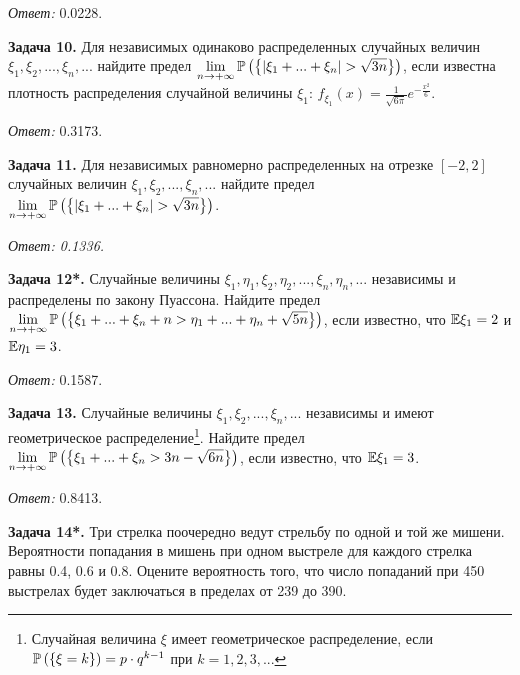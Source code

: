 \textit{Ответ: }0.0228.\textit{}

 

\textbf{Задача 10. }Для независимых одинаково распределенных случайных величин $\xi _{1} ,\xi _{2} ,...,\xi _{n} ,...$ найдите предел $\mathop{\lim }\limits_{n\to +\infty } {\rm {\mathbb P}}\left(\left\{\left|\xi _{1} +...+\xi _{n} \right|>\sqrt{3n} \right\}\right)$, если известна плотность распределения случайной величины $\xi _{1} $: $f_{\xi _{1} } \left(x\right)=\frac{1}{\sqrt{6\pi } } e^{-\frac{x^{2} }{6} } $. 

\textit{Ответ: }0.3173.



\textbf{Задача 11. }Для независимых равномерно распределенных на отрезке $\left[-2,2\right]$ случайных величин $\xi _{1} ,\xi _{2} ,...,\xi _{n} ,...$ найдите предел $\mathop{\lim }\limits_{n\to +\infty } {\rm {\mathbb P}}\left(\left\{\left|\xi _{1} +...+\xi _{n} \right|>\sqrt{3n} \right\}\right)$. 

\textit{Ответ: 0.1336.}

 

\textbf{Задача 12*. }Случайные величины $\xi _{1} ,\eta _{1} ,\xi _{2} ,\eta _{2} ,...,\xi _{n} ,\eta _{n} ,...$ независимы и распределены по закону Пуассона. Найдите предел $\mathop{\lim }\limits_{n\to +\infty } {\rm {\mathbb P}}\left(\left\{\xi _{1} +...+\xi _{n} +n>\eta _{1} +...+\eta _{n} +\sqrt{5n} \right\}\right)$, если известно, что ${\rm {\mathbb E}}\xi _{1} =2$ и ${\rm {\mathbb E}}\eta _{1} =3$. 

\textit{Ответ: }0.1587.



\textbf{Задача 13. }Случайные величины $\xi _{1} ,\xi _{2} ,...,\xi _{n} ,...$ независимы и имеют геометрическое распределение\footnote{ Случайная величина  $\xi $  имеет геометрическое распределение, если  ${\rm {\mathbb P}}\left(\left\{\xi =k\right\}\right)=p\cdot q^{k-1} $  при  $k=1,2,3,...$ }. Найдите предел $\mathop{\lim }\limits_{n\to +\infty } {\rm {\mathbb P}}\left(\left\{\xi _{1} +...+\xi _{n} >3n-\sqrt{6n} \right\}\right)$, если известно, что ${\rm {\mathbb E}}\xi _{1} =3$. 

\textit{Ответ: }0.8413.

 

\textbf{Задача 14*. }Три стрелка поочередно ведут стрельбу по одной и той же мишени. Вероятности попадания в мишень при одном выстреле для каждого стрелка равны 0.4, 0.6 и 0.8. Оцените вероятность того, что число попаданий при 450 выстрелах будет заключаться в пределах от 239 до 390. 


